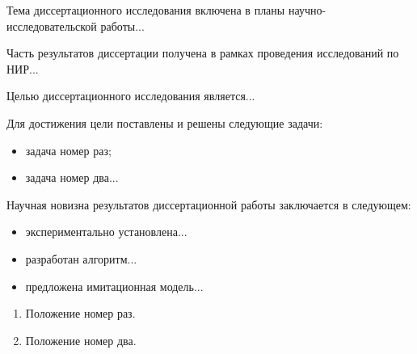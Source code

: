\Characteristic

\CharacteristicLinks
Тема диссертационного исследования включена в планы научно-исследовательской работы...

Часть результатов диссертации получена в рамках проведения исследований по НИР...

\CharacteristicTargets
Целью диссертационного исследования является...

Для достижения цели поставлены и решены следующие задачи:

\begin{itemize}
  \item задача номер раз;
  \item задача номер два...
\end{itemize}

\CharacteristicNovelty
Научная новизна результатов диссертационной работы заключается в следующем:
\begin{itemize}
\item экспериментально установлена...
\item разработан алгоритм...
\item предложена имитационная модель...
\end{itemize}

\CharacteristicIdeas
\begin{enumerate}
  \item Положение номер раз.
  \item Положение номер два.
\end{enumerate}

\CharacteristicContribution

\CharacteristicApprobation

\CharacteristicPublication

\CharacteristicStructure
